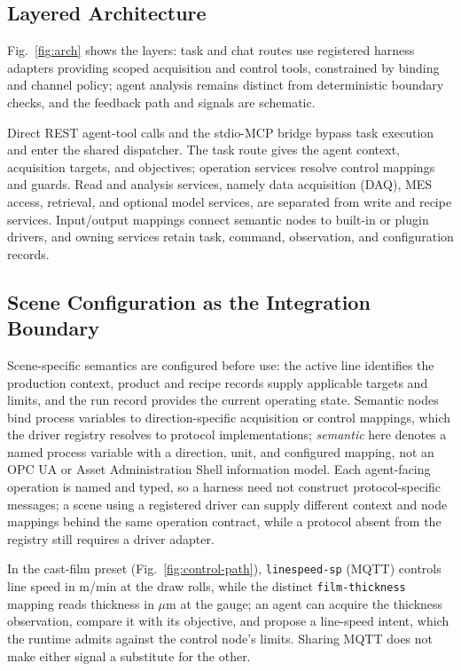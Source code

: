 \subsection{Layered Architecture}
\label{sec:layers}
Fig.~\ref{fig:arch} shows the layers: task and chat routes use registered harness adapters providing scoped acquisition and control tools, constrained by binding and channel policy; agent analysis remains distinct from deterministic boundary checks, and the feedback path and signals are schematic.

Direct REST agent-tool calls and the stdio-MCP bridge bypass task execution and enter the shared dispatcher. The task route gives the agent context, acquisition targets, and objectives; operation services resolve control mappings and guards. Read and analysis services, namely data acquisition (DAQ), MES access, retrieval, and optional model services, are separated from write and recipe services. Input/output mappings connect semantic nodes to built-in or plugin drivers, and owning services retain task, command, observation, and configuration records.

\subsection{Scene Configuration as the Integration Boundary}
\label{sec:scene-config}
Scene-specific semantics are configured before use: the active line identifies the production context, product and recipe records supply applicable targets and limits, and the run record provides the current operating state. Semantic nodes bind process variables to direction-specific acquisition or control mappings, which the driver registry resolves to protocol implementations; \emph{semantic} here denotes a named process variable with a direction, unit, and configured mapping, not an OPC UA or Asset Administration Shell information model. Each agent-facing operation is named and typed, so a harness need not construct protocol-specific messages; a scene using a registered driver can supply different context and node mappings behind the same operation contract, while a protocol absent from the registry still requires a driver adapter.

In the cast-film preset (Fig.~\ref{fig:control-path}), \texttt{linespeed-sp} (MQTT) controls line speed in m/min at the draw rolls, while the distinct \texttt{film-thickness} mapping reads thickness in $\mu$m at the gauge; an agent can acquire the thickness observation, compare it with its objective, and propose a line-speed intent, which the runtime admits against the control node's limits. Sharing MQTT does not make either signal a substitute for the other.

